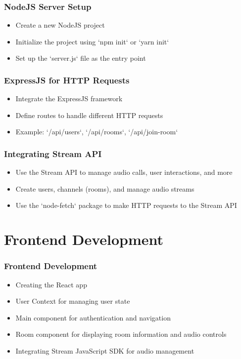 \documentclass{beamer}
\begin{document}
\begin{frame}
    \frametitle{NodeJS Server Setup}
    \begin{itemize}
        \item Create a new NodeJS project
        \item Initialize the project using `npm init` or `yarn init`
        \item Set up the `server.js` file as the entry point
    \end{itemize}
\end{frame}

\begin{frame}
    \frametitle{ExpressJS for HTTP Requests}
    \begin{itemize}
        \item Integrate the ExpressJS framework
        \item Define routes to handle different HTTP requests
        \item Example: `/api/users`, `/api/rooms`, `/api/join-room`
    \end{itemize}
\end{frame}

\begin{frame}
    \frametitle{Integrating Stream API}
    \begin{itemize}
        \item Use the Stream API to manage audio calls, user interactions, and more
        \item Create users, channels (rooms), and manage audio streams
        \item Use the `node-fetch` package to make HTTP requests to the Stream API
    \end{itemize}
\end{frame}

\section{Frontend Development}

\begin{frame}
    \frametitle{Frontend Development}
    \begin{itemize}
        \item Creating the React app
        \item User Context for managing user state
        \item Main component for authentication and navigation
        \item Room component for displaying room information and audio controls
        \item Integrating Stream JavaScript SDK for audio management
    \end{itemize}
\end{frame}
\end{document}
